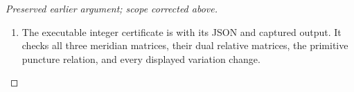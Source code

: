 \begin{proof}[Preserved earlier argument; scope corrected above]
\begin{enumerate}[label=\arabic*.]
\item The executable integer certificate is
 with its
JSON and captured output. It checks all three meridian
matrices, their dual relative matrices, the primitive
puncture relation, and every displayed variation change.

\end{enumerate}
\end{proof}